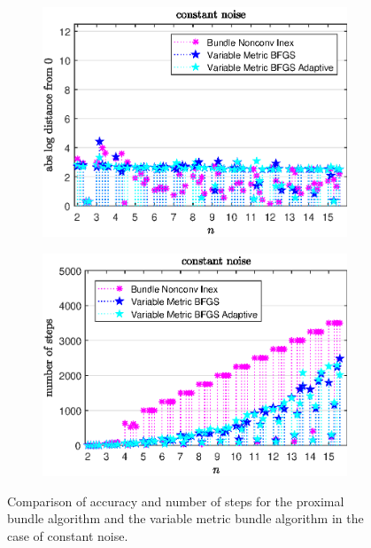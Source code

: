 \begin{figure}[ht]
	\begin{subfigure}{0.49\textwidth}
		\includegraphics[width=\textwidth]{Pictures/Plots/constant_noise.eps}%
	\end{subfigure}%
	\hfill
	\begin{subfigure}{0.49\textwidth}
		\includegraphics[width=\textwidth]{Pictures/Plots/steps_constant_noise.eps}%
	\end{subfigure}
	\caption[Accuracy and number of steps: constant noise]{Comparison of accuracy and number of steps for the proximal bundle algorithm and the variable metric bundle algorithm in the case of constant noise.}%
	\label{fig_const_noise}%
\end{figure}

